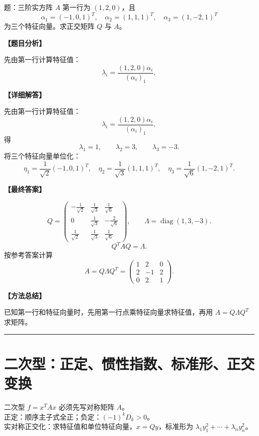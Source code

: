 ﻿\documentclass[11pt,a4paper,UTF8]{ctexart}
\begin{document}
\begin{answerbox}
题：三阶实方阵 $A$ 第一行为 $(1,2,0)$，且
\[\alpha_1=(-1,0,1)^T,\quad \alpha_2=(1,1,1)^T,\quad \alpha_3=(1,-2,1)^T\]
为三个特征向量。求正交矩阵 $Q$ 与 $A$。

\textbf{【题目分析】}

先由第一行计算特征值：
\[\lambda_i=\frac{(1,2,0)\alpha_i}{(\alpha_i)_1},\]

\textbf{【详细解答】}

先由第一行计算特征值：
\[\lambda_i=\frac{(1,2,0)\alpha_i}{(\alpha_i)_1},\]
得
\[
\lambda_1=1,\qquad \lambda_2=3,\qquad \lambda_3=-3.
\]
将三个特征向量单位化：
\[
\eta_1=\frac1{\sqrt2}(-1,0,1)^T,\quad
\eta_2=\frac1{\sqrt3}(1,1,1)^T,\quad
\eta_3=\frac1{\sqrt6}(1,-2,1)^T.
\]

\textbf{【最终答案】}

\[
Q=
\begin{pmatrix}
-\frac1{\sqrt2}&\frac1{\sqrt3}&\frac1{\sqrt6}\\
0&\frac1{\sqrt3}&-\frac2{\sqrt6}\\
\frac1{\sqrt2}&\frac1{\sqrt3}&\frac1{\sqrt6}
\end{pmatrix},
\qquad
\Lambda=\operatorname{diag}(1,3,-3).
\]
\[
Q^TAQ=\Lambda.
\]
按参考答案计算
\[
A=Q\Lambda Q^T=
\begin{pmatrix}
1&2&0\\
2&-1&2\\
0&2&1
\end{pmatrix}.
\]

\textbf{【方法总结】}

已知第一行和特征向量时，先用第一行点乘特征向量求特征值，再用 \(A=Q\Lambda Q^T\) 求矩阵。
\end{answerbox}
\bigskip\hrule\bigskip

\section{二次型：正定、惯性指数、标准形、正交变换}

\begin{identifybox}[高亮公式]
二次型 $f=x^TAx$ 必须先写对称矩阵 $A$。\\
正定：顺序主子式全正；负定：$(-1)^kD_k>0$。\\
实对称正交化：求特征值和单位特征向量，$x=Qy$，标准形为 $\lambda_1y_1^2+\cdots+\lambda_ny_n^2$。\\
\end{identifybox}
\end{document}
